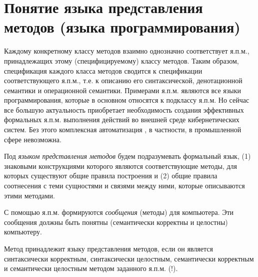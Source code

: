 \section{Понятие языка представления методов (языка программирования)}

Каждому конкретному классу методов взаимно однозначно соответствует я.п.м., принадлежащих этому (специфицируемому) классу методов. Таким образом, спецификация каждого класса методов сводится к спецификации соответствующего я.п.м., т.е. к описанию его синтаксической, денотационной семантики и операционной семантики. Примерами я.п.м. являются все языки программирования, которые в основном относятся к подклассу я.п.м. Но сейчас все большую актуальность приобретает необходимость создания эффективных формальных я.п.м. выполнения действий во внешней среде кибернетических систем. Без этого комплексная автоматизация \cite{Pospelov2021}, в частности, в промышленной сфере невозможна.

Под \textit{языком представления методов} будем подразумевать формальный язык, (1) знаковыми конструкциями которого являются соответствующие методы, для которых существуют общие правила построения и (2) общие правила соотнесения с теми сущностями и связями между ними, которые описываются этими методами.

С помощью я.п.м. формируются \textit{сообщения} (методы) для компьютера. Эти сообщения должны быть понятны (семантически корректны и целостны) компьютеру.

\begin{SCn}
\begin{scnindent}
\end{scnindent}
\end{SCn}

Метод принадлежит языку представления методов, если он является синтаксически корректным, синтаксически целостным, семантически корректным и семантически целостным методом заданного я.п.м. (!).

